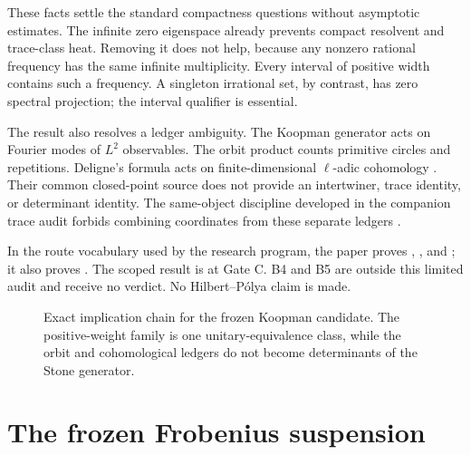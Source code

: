 \documentclass[11pt]{article}
\theoremstyle{definition}
\theoremstyle{remark}
\begin{document}
These facts settle the standard compactness questions without asymptotic
estimates.  The infinite zero eigenspace already prevents compact resolvent
and trace-class heat.  Removing it does not help, because any nonzero rational
frequency has the same infinite multiplicity.  Every interval of positive
width contains such a frequency.  A singleton irrational set, by contrast,
has zero spectral projection; the interval qualifier is essential.

The result also resolves a ledger ambiguity.  The Koopman generator acts on
Fourier modes of \(L^2\) observables.  The orbit product counts primitive
circles and repetitions.  Deligne's formula acts on finite-dimensional
\(\ell\)-adic cohomology \citep{Deligne1974}.  Their common closed-point source
does not provide an intertwiner, trace identity, or determinant identity.
The same-object discipline developed in the companion trace audit forbids
combining coordinates from these separate ledgers \citep{WangTraceBridge2026}.

In the route vocabulary used by the research program, the paper proves
,
, and
; it also proves .  The scoped
result is  at Gate C.  B4 and B5 are outside this
limited audit and receive no verdict.  No Hilbert--P\'olya claim is made.

\begin{figure}[t]
  \centering
  
  \caption{Exact implication chain for the frozen Koopman candidate.  The
  positive-weight family is one unitary-equivalence class, while the orbit and
  cohomological ledgers do not become determinants of the Stone generator.}
  \label{fig:obstruction}
\end{figure}

\section{The frozen Frobenius suspension}
\label{sec:frozen}
\end{document}
